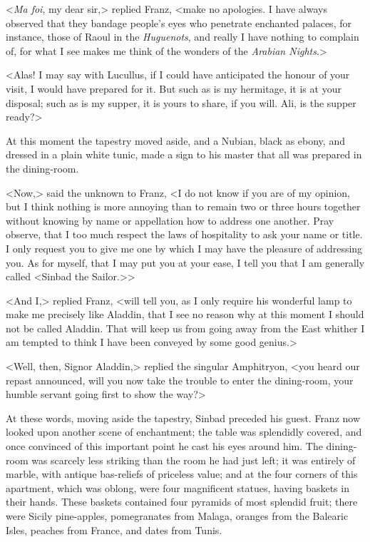  <\textit{Ma foi}, my dear sir,> replied Franz, <make no apologies. I have always observed that they bandage people's eyes who penetrate enchanted palaces, for instance, those of Raoul in the \textit{Huguenots}, and really I have nothing to complain of, for what I see makes me think of the wonders of the \textit{Arabian Nights}.>

<Alas! I may say with Lucullus, if I could have anticipated the honour of your visit, I would have prepared for it. But such as is my hermitage, it is at your disposal; such as is my supper, it is yours to share, if you will. Ali, is the supper ready?> 

 At this moment the tapestry moved aside, and a Nubian, black as ebony, and dressed in a plain white tunic, made a sign to his master that all was prepared in the dining-room. 

 <Now,> said the unknown to Franz, <I do not know if you are of my opinion, but I think nothing is more annoying than to remain two or three hours together without knowing by name or appellation how to address one another. Pray observe, that I too much respect the laws of hospitality to ask your name or title. I only request you to give me one by which I may have the pleasure of addressing you. As for myself, that I may put you at your ease, I tell you that I am generally called <Sinbad the Sailor.>> 

 <And I,> replied Franz, <will tell you, as I only require his wonderful lamp to make me precisely like Aladdin, that I see no reason why at this moment I should not be called Aladdin. That will keep us from going away from the East whither I am tempted to think I have been conveyed by some good genius.> 

 <Well, then, Signor Aladdin,> replied the singular Amphitryon, <you heard our repast announced, will you now take the trouble to enter the dining-room, your humble servant going first to show the way?> 

 At these words, moving aside the tapestry, Sinbad preceded his guest. Franz now looked upon another scene of enchantment; the table was splendidly covered, and once convinced of this important point he cast his eyes around him. The dining-room was scarcely less striking than the room he had just left; it was entirely of marble, with antique bas-reliefs of priceless value; and at the four corners of this apartment, which was oblong, were four magnificent statues, having baskets in their hands. These baskets contained four pyramids of most splendid fruit; there were Sicily pine-apples, pomegranates from Malaga, oranges from the Balearic Isles, peaches from France, and dates from Tunis. 

